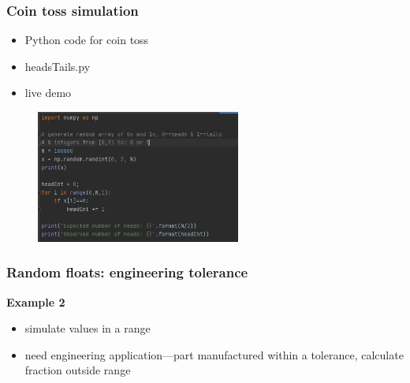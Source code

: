 \documentclass[english,14pt]{beamer}
\begin{document}

\begin{frame}[fragile]

\frametitle{Coin toss simulation}

\begin{itemize}
	\item Python code for coin toss
	\item headsTails.py
	\item live demo
\end{itemize}

\begin{figure}[ht]
	\centering
	\includegraphics[width=0.6\textwidth]{figures/headsTails}
\end{figure}

\end{frame}


\begin{frame}[fragile]

\frametitle{Random floats: engineering tolerance}

\textbf{Example 2}\\
\vspace*{5mm}
\begin{itemize}
	\item simulate values in a range
	\item need engineering application---part manufactured within a tolerance, calculate fraction outside range
\end{itemize}

\end{frame}

\end{document}
